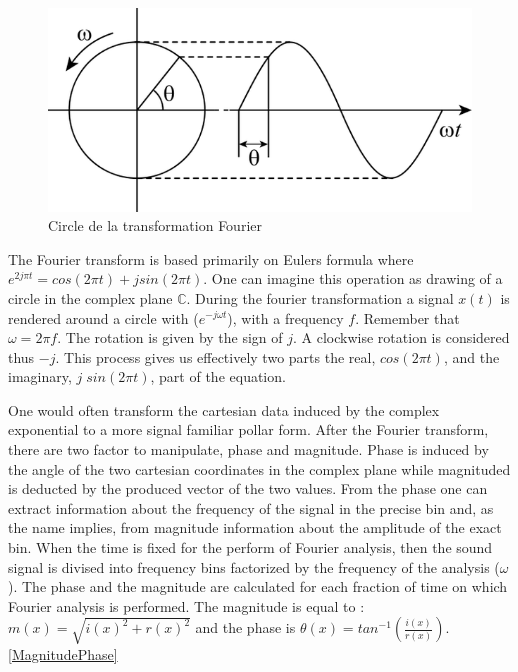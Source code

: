 
         \begin{figure}
            \centering
            \includegraphics[width = 0.5 \textwidth ]{Graphs/Fourier_Circle_1.png}
            \caption{Circle de la transformation Fourier}
            \label{CircleFourier}
        \end{figure}

The Fourier transform is based primarily on Eulers formula where $e ^ {2 j \pi t} = cos(2 \pi t) + j sin(2 \pi t)$. One can imagine this operation as drawing of a circle in the complex plane $\mathbb{C}$. During the fourier transformation a signal $x(t)$ is rendered around a circle with ($e ^ {- j \omega t}$), with a frequency $f$. Remember that $\omega = 2 \pi f$. The rotation is given by the sign of $j$. A clockwise rotation is considered thus $-j$. This process gives us effectively two parts the real, $cos( 2 \pi t)$, and the imaginary, $j \; sin(2 \pi t)$,  part of the equation.


One would often transform the cartesian data induced by the complex exponential to a more signal familiar pollar form. After the Fourier transform, there are two factor to manipulate, phase and magnitude. Phase is induced by the angle of the two cartesian coordinates in the complex plane while magnituded is deducted by the produced vector of the two values. From the phase one can extract information about the frequency of the signal in the precise bin and, as the name implies, from magnitude information about the amplitude of the exact bin. When the time is fixed for the perform of Fourier analysis, then the sound signal is divised into frequency bins factorized by the frequency of the analysis ($\omega$). The phase and the magnitude are calculated for each fraction of time on which Fourier analysis is performed. The magnitude is equal to : $m(x) = \sqrt{i(x)^2 + r(x)^2}$ and the phase is $\theta(x) = tan^{-1}(\frac{i(x)}{r(x)})$. \ref{MagnitudePhase}


